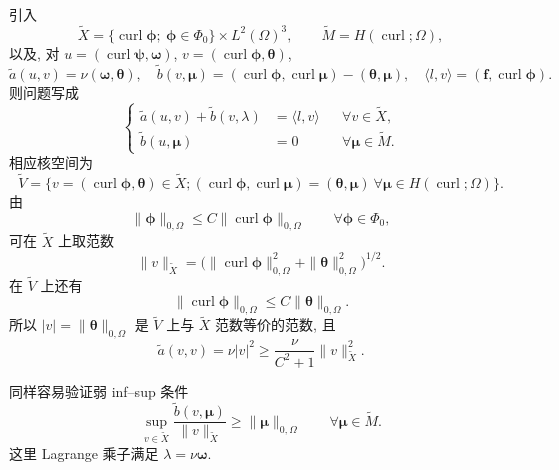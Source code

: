 引入
\[
\widetilde X=\{\operatorname{curl}\boldsymbol\phi;
\ \boldsymbol\phi\in\Phi_0\}\times L^2(\Omega)^3,
\qquad \widetilde M=H(\operatorname{curl};\Omega),
\]
以及, 对
$u=(\operatorname{curl}\boldsymbol\psi,\boldsymbol\omega)$,
$v=(\operatorname{curl}\boldsymbol\phi,\boldsymbol\theta)$,
\[
\widetilde a(u,v)=\nu(\boldsymbol\omega,\boldsymbol\theta),
\quad
\widetilde b(v,\boldsymbol\mu)
=(\operatorname{curl}\boldsymbol\phi,
\operatorname{curl}\boldsymbol\mu)
-(\boldsymbol\theta,\boldsymbol\mu),
\quad
\langle l,v\rangle=(\mathbf f,\operatorname{curl}\boldsymbol\phi).
\]
则问题写成
\begin{equation}\label{eq:incompressible-vector-potential-abstract-problem}
\left\{
\begin{aligned}
\widetilde a(u,v)+\widetilde b(v,\lambda)&=\langle l,v\rangle
&&\forall v\in\widetilde X,\\
\widetilde b(u,\boldsymbol\mu)&=0
&&\forall\boldsymbol\mu\in\widetilde M.
\end{aligned}
\right.
\end{equation}
相应核空间为
\[
\widetilde V=\{v=(\operatorname{curl}\boldsymbol\phi,\boldsymbol\theta)
\in\widetilde X;
(\operatorname{curl}\boldsymbol\phi,
\operatorname{curl}\boldsymbol\mu)
=(\boldsymbol\theta,\boldsymbol\mu)
\ \forall\boldsymbol\mu\in H(\operatorname{curl};\Omega)\}.
\]
由
\begin{equation}\label{eq:incompressible-vector-potential-poincare}
\|\boldsymbol\phi\|_{0,\Omega}
\leq C\|\operatorname{curl}\boldsymbol\phi\|_{0,\Omega}
\qquad\forall\boldsymbol\phi\in\Phi_0,
\end{equation}
可在 $\widetilde X$ 上取范数
\[
\|v\|_{\widetilde X}
=\bigl(\|\operatorname{curl}\boldsymbol\phi\|_{0,\Omega}^2
+\|\boldsymbol\theta\|_{0,\Omega}^2\bigr)^{1/2}.
\]
在 $\widetilde V$ 上还有
\begin{equation}\label{eq:incompressible-vector-potential-kernel-control}
\|\operatorname{curl}\boldsymbol\phi\|_{0,\Omega}
\leq C\|\boldsymbol\theta\|_{0,\Omega}.
\end{equation}
所以 $|v|=\|\boldsymbol\theta\|_{0,\Omega}$
是 $\widetilde V$ 上与 $\widetilde X$ 范数等价的范数, 且
\[
\widetilde a(v,v)=\nu|v|^2
\geq\frac{\nu}{C^2+1}\|v\|_{\widetilde X}^2.
\]

同样容易验证弱 inf--sup 条件
\[
\sup_{v\in\widetilde X}
\frac{\widetilde b(v,\boldsymbol\mu)}{\|v\|_{\widetilde X}}
\geq\|\boldsymbol\mu\|_{0,\Omega}
\qquad\forall\boldsymbol\mu\in\widetilde M.
\]
这里 Lagrange 乘子满足 $\lambda=\nu\boldsymbol\omega$.

